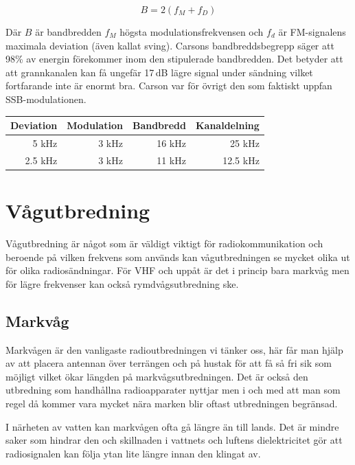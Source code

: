\begin{equation}
	B=2(f_M+f_D)
\end{equation}

Där $B$ är bandbredden $f_M$ högsta modulationsfrekvensen och $f_d$ är
FM-signalens maximala deviation (även kallat sving). Carsons bandbreddsbegrepp
säger att 98\% av energin förekommer inom den stipulerade bandbredden. Det
betyder att att grannkanalen kan få ungefär 17\,dB lägre signal under sändning
vilket fortfarande inte är enormt bra. Carson var för övrigt den som faktiskt
uppfan SSB-modulationen.

\begin{center}
\begin{tabular}{rrrr}
	Deviation & Modulation & Bandbredd & Kanaldelning \\ \hline
	    5 kHz &      3 kHz &    16 kHz &       25 kHz \\
	  2.5 kHz &      3 kHz &    11 kHz &     12.5 kHz
\end{tabular}
\end{center}

\section{Vågutbredning}
\label{vågutbredning}

Vågutbredning är något som är väldigt viktigt för radiokommunikation och
beroende på vilken frekvens som används kan vågutbredningen se mycket olika ut
för olika radiosändningar. För VHF och uppåt är det i princip bara markvåg men
för lägre frekvenser kan också rymdvågsutbredning ske.

\subsection{Markvåg}

Markvågen är den vanligaste radioutbredningen vi tänker oss, här får man hjälp
av att placera antennan över terrängen och på hustak för att få så fri sik som
möjligt vilket ökar längden på markvågsutbredningen. Det är också den
utbredning som handhållna radioapparater nyttjar men i och med att man som
regel då kommer vara mycket nära marken blir oftast utbredningen begränsad.

I närheten av vatten kan markvågen ofta gå längre än till lands. Det är mindre
saker som hindrar den och skillnaden i vattnets och luftens dielektricitet gör
att radiosignalen kan följa ytan lite längre innan den klingat av.

